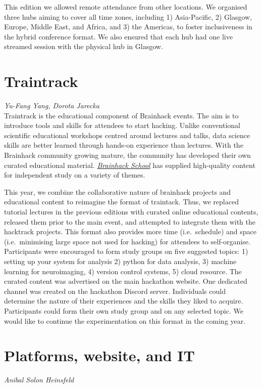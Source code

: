 \documentclass[12pt,a4paper,onecolumn]{article}
\let\Oldsection\section
\renewcommand{\section}{\FloatBarrier\Oldsection}
\newcommand{\authors}[1]{\emph{\scriptsize #1} \\}
\begin{document}
This edition we allowed remote attendance from other locations. We
organised three hubs aiming to cover all time zones, including 1)
Asia-Pacific, 2) Glasgow, Europe, Middle East, and Africa, and 3) the
Americas, to foster inclusiveness in the hybrid conference format. We also
ensured that each hub had one live streamed session with the physical
hub in Glasgow.

\section{Traintrack}
\authors{Yu-Fang Yang, %
Dorota Jarecka}
%

Traintrack is the educational component of Brainhack events. The aim is
to introduce tools and skills for attendees to start hacking. Unlike
conventional scientific educational workshops centred around lectures
and talks, data science skills are better learned through hands-on
experience than lectures. With the Brainhack community growing mature,
the community has developed their own curated educational material.
\href{https://school.brainhackmtl.org/}{\emph{Brainhack School}} has
supplied high-quality content for independent study on a variety of
themes.

This year, we combine the collaborative nature of brainhack projects and
educational content to reimagine the format of traintack. Thus, we
replaced tutorial lectures in the previous editions with curated online
educational contents, released them prior to the main event, and
attempted to integrate them with the hacktrack projects. This format
also provides more time (i.e.\ schedule) and space (i.e.\ minimising large
space not used for hacking) for attendees to self-organise. Participants
were encouraged to form study groups on five suggested topics: 1)
setting up your system for analysis 2) python for data analysis, 3)
machine learning for neuroimaging, 4) version control systems, 5) cloud
resource. The curated content was advertised on the main hackathon
website. One dedicated channel was created on the hackathon Discord
server. Individuals could determine the nature of their experiences and
the skills they liked to acquire. Participants could form their own
study group and on any selected topic. We would like to continue the
experimentation on this format in the coming year.

\section{Platforms, website, and IT}
\authors{Anibal Solon Heinsfeld}
%
\end{document}
